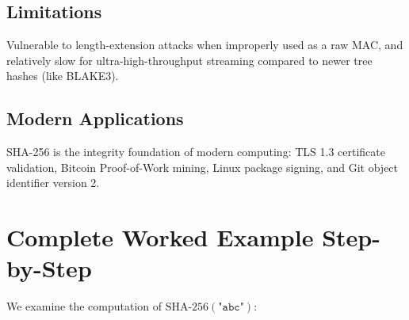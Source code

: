 \subsection{Limitations}
Vulnerable to length-extension attacks when improperly used as a raw MAC, and relatively slow for ultra-high-throughput streaming compared to newer tree hashes (like BLAKE3).

\subsection{Modern Applications}
SHA-256 is the integrity foundation of modern computing: TLS 1.3 certificate validation, Bitcoin Proof-of-Work mining, Linux package signing, and Git object identifier version 2.

\section{Complete Worked Example Step-by-Step}
We examine the computation of $\text{SHA-256}(\texttt{"abc"})$:
